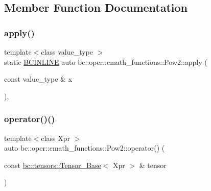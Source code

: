 \subsection{Member Function Documentation}
\mbox{\label{structbc_1_1oper_1_1cmath__functions_1_1Pow2_a7a8e59467ac5b0c23b0250d5685af53b}} 
\subsubsection{\texorpdfstring{apply()}{apply()}}
{\footnotesize\ttfamily template$<$class value\+\_\+type $>$ \\
static \hyperlink{common_8h_a6699e8b0449da5c0fafb878e59c1d4b1}{B\+C\+I\+N\+L\+I\+NE} auto bc\+::oper\+::cmath\+\_\+functions\+::\+Pow2\+::apply (\begin{DoxyParamCaption}\item[{const value\+\_\+type \&}]{x }\end{DoxyParamCaption})\hspace{0.3cm}{\ttfamily [inline]}, {\ttfamily [static]}}

\mbox{\label{structbc_1_1oper_1_1cmath__functions_1_1Pow2_a88b5e3374d6f1286c9d3f9e6f4f1c9de}} 
\subsubsection{\texorpdfstring{operator()()}{operator()()}\hspace{0.1cm}{\footnotesize\ttfamily [1/3]}}
{\footnotesize\ttfamily template$<$class Xpr $>$ \\
auto bc\+::oper\+::cmath\+\_\+functions\+::\+Pow2\+::operator() (\begin{DoxyParamCaption}\item[{const \hyperlink{classbc_1_1tensors_1_1Tensor__Base}{bc\+::tensors\+::\+Tensor\+\_\+\+Base}$<$ Xpr $>$ \&}]{tensor }\end{DoxyParamCaption})\hspace{0.3cm}{\ttfamily [inline]}}

